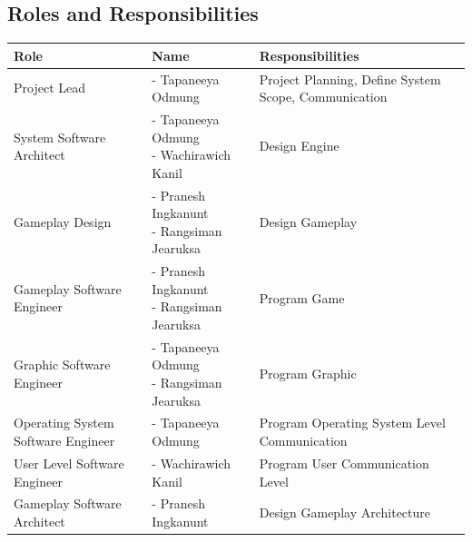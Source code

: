 
\subsection{Roles and Responsibilities}
\label{subsec:roles-and-responsibilities}

\vspace{1em}

\centering
\small
\begin{minipage}{\textwidth}
    \begin{tabularx}{\textwidth}{|L|L|L|}
        \hline
        \textbf{Role} & \textbf{Name} & \textbf{Responsibilities} \\
        \hline
        Project Lead & - Tapaneeya Odmung & Project Planning, Define System Scope, Communication \\
        System Software Architect & {- Tapaneeya Odmung \newline - Wachirawich Kanil} & Design Engine \\
        Gameplay Design & {- Pranesh Ingkanunt \newline - Rangsiman Jearuksa} & Design Gameplay \\
        Gameplay Software Engineer & {- Pranesh Ingkanunt \newline - Rangsiman Jearuksa} & Program Game \\
        Graphic Software Engineer & {- Tapaneeya Odmung \newline - Rangsiman Jearuksa} & Program Graphic \\
        Operating System Software Engineer & - Tapaneeya Odmung & Program Operating System Level Communication \\
        User Level Software Engineer & - Wachirawich Kanil & Program User Communication Level \\
        Gameplay Software Architect & - Pranesh Ingkanunt & Design Gameplay Architecture \\
        \hline
    \end{tabularx}
\end{minipage}
\label{tab:role-name-responsibilities}